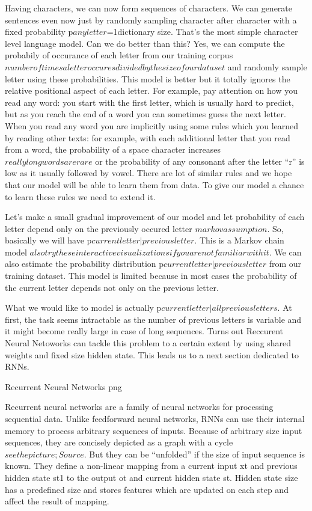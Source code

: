 \documentclass{article}
\begin{document}
Having characters, we can now form sequences of characters. We can generate sentences even now just by randomly sampling character after character with a fixed probability p\(any letter\)=1dictionary size. That’s the most simple character level language model. Can we do better than this? Yes, we can compute the probabily of occurance of each letter from our training corpus \(number of times a letter occures divided by the size of our dataset\) and randomly sample letter using these probabilities. This model is better but it totally ignores the relative positional aspect of each letter. For example, pay attention on how you read any word: you start with the first letter, which is usually hard to predict, but as you reach the end of a word you can sometimes guess the next letter. When you read any word you are implicitly using some rules which you learned by reading other texts: for example, with each additional letter that you read from a word, the probability of a space character increases \(really long words are rare\) or the probability of any consonant after the letter “r” is low as it usually followed by vowel. There are lot of similar rules and we hope that our model will be able to learn them from data. To give our model a chance to learn these rules we need to extend it.

Let’s make a small gradual improvement of our model and let probability of each letter depend only on the previously occured letter \(markov assumption\). So, basically we will have p\(current letter|previous letter\). This is a Markov chain model \(also try these interactive visualizations if you are not familiar with it\). We can also estimate the probability distribution p\(current letter|previous letter\) from our training dataset. This model is limited because in most cases the probability of the current letter depends not only on the previous letter.

What we would like to model is actually p\(current letter|all previous letters\). At first, the task seems intractable as the number of previous letters is variable and it might become really large in case of long sequences. Turns out Reccurent Neural Netoworks can tackle this problem to a certain extent by using shared weights and fixed size hidden state. This leads us to a next section dedicated to RNNs.

Recurrent Neural Networks
png

Recurrent neural networks are a family of neural networks for processing sequential data. Unlike feedforward neural networks, RNNs can use their internal memory to process arbitrary sequences of inputs. Because of arbitrary size input sequences, they are concisely depicted as a graph with a cycle \(see the picture; Source\). But they can be “unfolded” if the size of input sequence is known. They define a non-linear mapping from a current input xt and previous hidden state st1 to the output ot and current hidden state st. Hidden state size has a predefined size and stores features which are updated on each step and affect the result of mapping.
\end{document}
